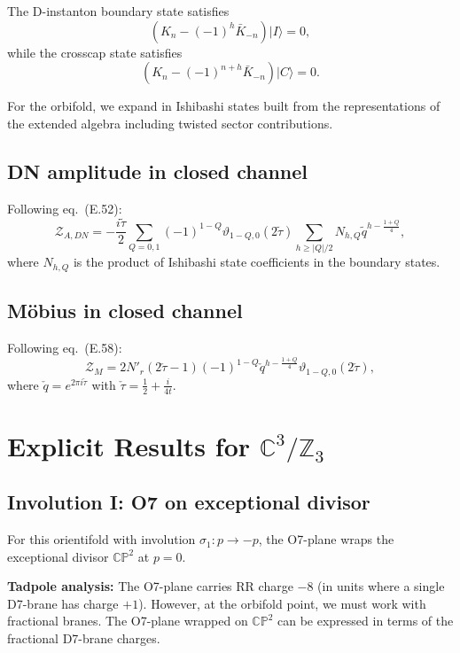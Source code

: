 \documentclass[11pt]{article}
\newcommand{\Z}{\mathbb{Z}}
\newcommand{\C}{\mathbb{C}}
\newcommand{\CP}{\mathbb{CP}}
\begin{document}
The D-instanton boundary state satisfies
\begin{equation}
(K_n - (-1)^h \bar{K}_{-n}) |I\rangle = 0,
\end{equation}
while the crosscap state satisfies
\begin{equation}
(K_n - (-1)^{n+h} \bar{K}_{-n}) |C\rangle = 0.
\end{equation}

For the orbifold, we expand in Ishibashi states built from the representations of the extended algebra including twisted sector contributions.

\subsection{DN amplitude in closed channel}

Following eq.~(E.52):
\begin{equation}
\mathcal{Z}_{A,DN} = -\frac{i\tilde{\tau}}{2} \sum_{Q=0,1} (-1)^{1-Q} \vartheta_{1-Q,0}(2\tilde{\tau}) \sum_{h \geq |Q|/2} N_{h,Q} \tilde{q}^{h - \frac{1+Q}{4}},
\end{equation}
where $N_{h,Q}$ is the product of Ishibashi state coefficients in the boundary states.

\subsection{M\"obius in closed channel}

Following eq.~(E.58):
\begin{equation}
\mathcal{Z}_M = 2 N'_r (2\check{\tau} - 1) (-1)^{1-Q} \check{q}^{h - \frac{1+Q}{4}} \vartheta_{1-Q,0}(2\check{\tau}),
\end{equation}
where $\check{q} = e^{2\pi i \check{\tau}}$ with $\check{\tau} = \frac{1}{2} + \frac{i}{4t}$.

\section{Explicit Results for $\C^3/\Z_3$}

\subsection{Involution I: O7 on exceptional divisor}

For this orientifold with involution $\sigma_1: p \to -p$, the O7-plane wraps the exceptional divisor $\CP^2$ at $p=0$.

\textbf{Tadpole analysis:} The O7-plane carries RR charge $-8$ (in units where a single D7-brane has charge $+1$). However, at the orbifold point, we must work with fractional branes. The O7-plane wrapped on $\CP^2$ can be expressed in terms of the fractional D7-brane charges.
\end{document}
